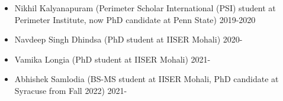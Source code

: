 \begin{itemize}
\vspace{1mm} 
  \item  Nikhil Kalyanapuram (Perimeter Scholar International (PSI) student at Perimeter Institute, now PhD candidate at Penn State) \hfill  2019-2020 
  \item  Navdeep Singh Dhindsa (PhD student at IISER Mohali) \hfill 2020- 
  \item  Vamika Longia (PhD student at IISER Mohali) \hfill 2021- 
  \item  Abhishek Samlodia (BS-MS student at IISER Mohali, PhD candidate at Syracuse from Fall 2022) \hfill 2021- 
  \end{itemize}
